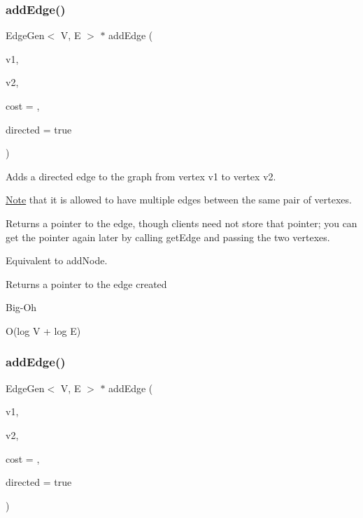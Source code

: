 \subsubsection{\texorpdfstring{add\+Edge()}{addEdge()}\hspace{0.1cm}{\footnotesize\ttfamily [1/3]}}
{\footnotesize\ttfamily Edge\+Gen$<$ V, E $>$ $\ast$ add\+Edge (\begin{DoxyParamCaption}\item[{const std\+::string \&}]{v1,  }\item[{const std\+::string \&}]{v2,  }\item[{double}]{cost = {},  }\item[{bool}]{directed = {\ttfamily true} }\end{DoxyParamCaption})}



Adds a directed edge to the graph from vertex v1 to vertex v2. 

\mbox{\hyperlink{classNote}{Note}} that it is allowed to have multiple edges between the same pair of vertexes.

Returns a pointer to the edge, though clients need not store that pointer; you can get the pointer again later by calling get\+Edge and passing the two vertexes.

Equivalent to add\+Node.

\begin{DoxyReturn}{Returns}
a pointer to the edge created 
\end{DoxyReturn}
\begin{DoxyRefDesc}{Big-\/\+Oh}
\item[\mbox{\hyperlink{BigOh__BigOh000003}{Big-\/\+Oh}}]O(log V + log E) \end{DoxyRefDesc}
\mbox{\label{classBasicGraphGen_ac2fe8fab4722e89853df8ed385aa7a26}} 
\subsubsection{\texorpdfstring{add\+Edge()}{addEdge()}\hspace{0.1cm}{\footnotesize\ttfamily [2/3]}}
{\footnotesize\ttfamily Edge\+Gen$<$ V, E $>$ $\ast$ add\+Edge (\begin{DoxyParamCaption}\item[{\mbox{\hyperlink{classVertexGen}{Vertex\+Gen}}$<$ V, E $>$ $\ast$}]{v1,  }\item[{\mbox{\hyperlink{classVertexGen}{Vertex\+Gen}}$<$ V, E $>$ $\ast$}]{v2,  }\item[{double}]{cost = {},  }\item[{bool}]{directed = {\ttfamily true} }\end{DoxyParamCaption})}



